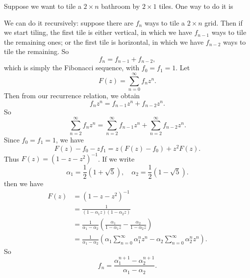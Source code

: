 \begin{note}
  \begin{field}
    \begin{eg}
      Suppose we want to tile a $2\times n$ bathroom by $2\times 1$ tiles. One way to do it is
      \begin{center}
      \end{center}
      We can do it recursively: suppose there are $f_n$ ways to tile a $2\times n$ grid. Then if we start tiling, the first tile is either vertical, in which we have $f_{n - 1}$ ways to tile the remaining ones; or the first tile is horizontal, in which we have $f_{n - 2}$ ways to tile the remaining. So
      \[
        f_n = f_{n - 1} + f_{n - 2},
      \]
      which is simply the Fibonacci sequence, with $f_0 = f_1 = 1$.
      Let
      \[
        F(z) = \sum_{n = 0}^\infty f_nz^n.
      \]
      Then from our recurrence relation, we obtain
      \[
        f_nz^n = f_{n - 1}z^n + f_{n - 2}z^n.
      \]
      So
      \[
        \sum_{n = 2}^\infty f_n z^n = \sum_{n = 2}^{\infty} f_{n - 1}z^n + \sum_{n = 2}^\infty f_{n - 2}z^n.
      \]
      Since $f_0 = f_1 = 1$, we have
      \[
        F(z) - f_0 - zf_1 = z(F(z) - f_0) + z^2F(z).
      \]
      Thus $F(z) = (1 - z - z^2)^{-1}$. If we write
      \[
        \alpha_1 = \frac{1}{2}(1 + \sqrt{5}),\quad \alpha_2 = \frac{1}{2}(1 - \sqrt{5}).
      \]
      then we have
      \begin{align*}
        F(z) &= (1 - z - z^2)^{-1}\\
        &= \frac{1}{(1 - \alpha_1 z)(1 - \alpha_2 z)}\\
        &= \frac{1}{\alpha_1 - \alpha_2}\left(\frac{\alpha_1}{1 - \alpha_1 z} - \frac{\alpha_2}{1 - \alpha_2 z}\right)\\
        &= \frac{1}{\alpha_1 - \alpha_2}\left(\alpha_1 \sum_{n = 0}^\infty \alpha_1^nz^n - \alpha_2\sum_{n = 0}^\infty \alpha_2^n z^n\right).
      \end{align*}
      So
      \[
        f_n = \frac{\alpha_1^{n + 1} - \alpha_2^{n + 1}}{\alpha_1 - \alpha_2}.
      \]
    \end{eg}
  \end{field}

\end{note}
